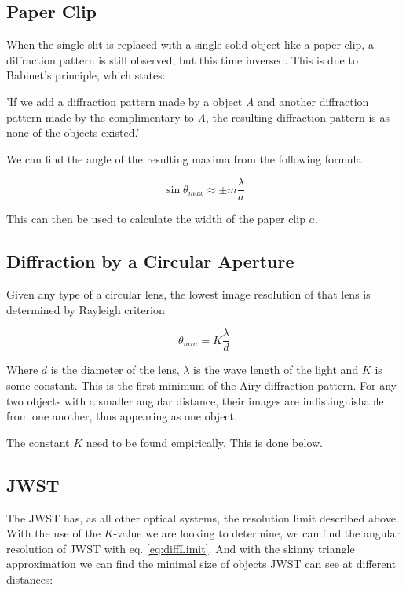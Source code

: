 \documentclass{emulateapj}
\begin{document}
\subsection{Paper Clip}\label{sec:theoryPaperClip}
When the single slit is replaced with a single solid object like a paper clip, a diffraction pattern is still observed, but this time inversed. This is due to Babinet's principle, which states: 

'If we add a diffraction pattern made by a object \textit{A} and another diffraction pattern made by the complimentary to \textit{A}, the resulting diffraction pattern is as none of the objects existed.'\cite{bolger}

We can find the angle of the resulting maxima from the following formula

\begin{equation}
\sin \theta_{max} \approx \pm m\frac{\lambda}{a}
\end{equation}\label{eq:paperClipMax}

This can then be used to calculate the width of the paper clip $a$.

\subsection{Diffraction by a Circular Aperture}\label{sec:theoryAiry}
Given any type of a circular lens, the lowest image resolution of that lens is determined by Rayleigh criterion

\begin{equation}
\theta_{min} = K\frac{\lambda}{d}
\end{equation}\label{eq:diffLimit}

Where $d$ is the diameter of the lens, $\lambda$ is the wave length of the light and $K$ is some constant. This is the first minimum of the Airy diffraction pattern. For any two objects with a smaller angular distance, their images are indistinguishable from one another, thus appearing as one object.

The constant $K$ need to be found empirically. This is done below.


\subsection{JWST}
The JWST has, as all other optical systems, the resolution limit described above. With the use of the $K$-value we are looking to determine, we can find the angular resolution of JWST with eq. \eqref{eq:diffLimit}. And with the skinny triangle approximation we can find the minimal size of objects JWST can see at different distances:
\end{document}
